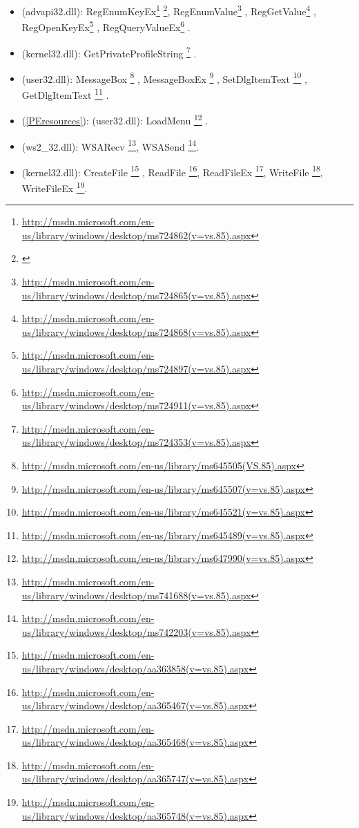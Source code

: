 \begin{itemize}

\item
{} (advapi32.dll): 
RegEnumKeyEx\footnote{\url{http://msdn.microsoft.com/en-us/library/windows/desktop/ms724862(v=vs.85).aspx}}
\footnote{
	\label{note1}},
RegEnumValue\footnote{\url{http://msdn.microsoft.com/en-us/library/windows/desktop/ms724865(v=vs.85).aspx}}
,
RegGetValue\footnote{\url{http://msdn.microsoft.com/en-us/library/windows/desktop/ms724868(v=vs.85).aspx}}
,
RegOpenKeyEx\footnote{\url{http://msdn.microsoft.com/en-us/library/windows/desktop/ms724897(v=vs.85).aspx}}
,
RegQueryValueEx\footnote{\url{http://msdn.microsoft.com/en-us/library/windows/desktop/ms724911(v=vs.85).aspx}}
.

\item
{} (kernel32.dll): 
GetPrivateProfileString
\footnote{\url{http://msdn.microsoft.com/en-us/library/windows/desktop/ms724353(v=vs.85).aspx}}
.

\item
{} (user32.dll): 
MessageBox
\footnote{\url{http://msdn.microsoft.com/en-us/library/ms645505(VS.85).aspx}}
, 
MessageBoxEx
\footnote{\url{http://msdn.microsoft.com/en-us/library/ms645507(v=vs.85).aspx}}
,
SetDlgItemText
\footnote{\url{http://msdn.microsoft.com/en-us/library/ms645521(v=vs.85).aspx}}
,
GetDlgItemText
\footnote{\url{http://msdn.microsoft.com/en-us/library/ms645489(v=vs.85).aspx}}
.

\item
{}(\ref{PEresources}): (user32.dll): LoadMenu
\footnote{\url{http://msdn.microsoft.com/en-us/library/ms647990(v=vs.85).aspx}}
.
\item
{} (ws2\_32.dll):
WSARecv
\footnote{\url{http://msdn.microsoft.com/en-us/library/windows/desktop/ms741688(v=vs.85).aspx}},
WSASend
\footnote{\url{http://msdn.microsoft.com/en-us/library/windows/desktop/ms742203(v=vs.85).aspx}}.

\item
{} (kernel32.dll):
CreateFile
\footnote{\url{http://msdn.microsoft.com/en-us/library/windows/desktop/aa363858(v=vs.85).aspx}}
,
ReadFile
\footnote{\url{http://msdn.microsoft.com/en-us/library/windows/desktop/aa365467(v=vs.85).aspx}},
ReadFileEx
\footnote{\url{http://msdn.microsoft.com/en-us/library/windows/desktop/aa365468(v=vs.85).aspx}},
WriteFile
\footnote{\url{http://msdn.microsoft.com/en-us/library/windows/desktop/aa365747(v=vs.85).aspx}},
WriteFileEx
\footnote{\url{http://msdn.microsoft.com/en-us/library/windows/desktop/aa365748(v=vs.85).aspx}}.


\end{itemize}
